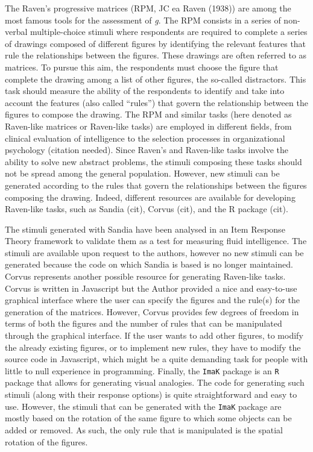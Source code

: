 The Raven's progressive matrices (RPM, JC ea Raven (1938)) are among the most famous tools for the assessment of \emph{g}. The RPM consists in a series of non-verbal multiple-choice stimuli where respondents are required to complete a series of drawings composed of different figures by identifying the relevant features that rule the relationships between the figures. These drawings are often referred to as matrices.
To pursue this aim, the respondents must choose the figure that complete the drawing among a list of other figures, the so-called distractors.
This task should measure the ability of the respondents to identify and take into account the features (also called ``rules'') that govern the relationship between the figures to compose the drawing.
The RPM and similar tasks (here denoted as Raven-like matrices or Raven-like tasks) are employed in different fields, from clinical evaluation of intelligence to the selection processes in organizational psychology (citation needed).
Since Raven's and Raven-like tasks involve the ability to solve new abstract problems, the stimuli composing these tasks should not be spread among the general population.
However, new stimuli can be generated according to the rules that govern the relationships between the figures composing the drawing. Indeed, different resources are available for developing Raven-like tasks, such as Sandia (cit), Corvus (cit), and the R package  (cit).

The stimuli generated with Sandia have been analysed in an Item Response Theory framework to validate them as a test for measuring fluid intelligence.
The stimuli are available upon request to the authors, however no new stimuli can be generated because the code on which Sandia is based is no longer maintained.
Corvus represents another possible resource for generating Raven-like tasks. Corvus is written in Javascript but the Author provided a nice and easy-to-use graphical interface where the user can specify the figures and the rule(s) for the generation of the matrices. However, Corvus provides few degrees of freedom in terms of both the figures and the number of rules that can be manipulated through the graphical interface. If the user wants to add other figures, to modify the already existing figures, or to implement new rules, they have to modify the source code in Javascript, which might be a quite demanding task for people with little to null experience in programming.
Finally, the \texttt{ImaK} package is an \texttt{R} package that allows for generating visual analogies. The code for generating such stimuli (along with their response options) is quite straightforward and easy to use. However, the stimuli that can be generated with the \texttt{ImaK} package are mostly based on the rotation of the same figure to which some objects can be added or removed. As such, the only rule that is manipulated is the spatial rotation of the figures.

